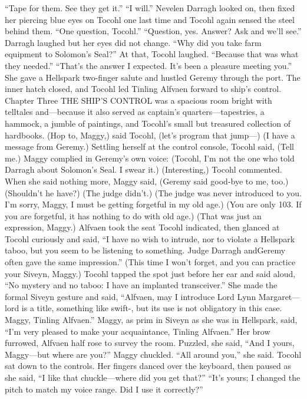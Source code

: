 \documentclass[9pt]{article}
\begin{document}
“Tape for them. See they get it.”
“I will.”
Nevelen Darragh looked on, then fixed her piercing blue eyes on Tocohl one last time and Tocohl
again sensed the steel behind them. “One question, Tocohl.”
“Question, yes. Answer? Ask and we’ll see.”
Darragh laughed but her eyes did not change. “Why did you take farm equipment to Solomon’s
Seal?”
At that, Tocohl laughed. “Because that was what they needed.”
“That’s the answer I expected. It’s been a pleasure meeting you.” She gave a Hellspark two-finger
salute and hustled Geremy through the port.
The inner hatch closed, and Tocohl led Tinling Alfvaen forward to ship’s control.
Chapter Three
THE SHIP’S CONTROL was a spacious room bright with telltales and—because it also served
as captain’s quarters—tapestries, a hammock, a jumble of paintings, and Tocohl’s small but treasured
collection of hardbooks.
(Hop to, Maggy,) said Tocohl, (let’s program that jump—)
(I have a message from Geremy.)
Settling herself at the control console, Tocohl said, (Tell me.)
Maggy complied in Geremy’s own voice: (Tocohl, I’m not the one who told Darragh about
Solomon’s Seal. I swear it.)
(Interesting,) Tocohl commented.
When she said nothing more, Maggy said, (Geremy said good-bye to me, too.)
(Shouldn’t he have?)
(The judge didn’t.)
(The judge was never introduced to you. I’m sorry, Maggy, I must be getting forgetful in my old age.)
(You are only 103. If you are forgetful, it has nothing to do with old age.)
(That was just an expression, Maggy.)
Alfvaen took the seat Tocohl indicated, then glanced at Tocohl curiously and said, “I have no wish to
intrude, nor to violate a Hellspark taboo, but you seem to be listening to something. Judge Darragh andGeremy often gave the same impression.”
(This time I won’t forget, and you can practice your Siveyn, Maggy.) Tocohl tapped the spot just
before her ear and said aloud, “No mystery and no taboo: I have an implanted transceiver.” She made
the formal Siveyn gesture and said, “Alfvaen, may I introduce Lord Lynn Margaret—lord is a title,
something like swift-, but its use is not obligatory in this case. Maggy, Tinling Alfvaen.”
Maggy, as prim in Siveyn as she was in Hellspark, said, “I’m very pleased to make your
acquaintance, Tinling Alfvaen.”
Her brow furrowed, Alfvaen half rose to survey the room. Puzzled, she said, “And I yours,
Maggy—but where are you?”
Maggy chuckled. “All around you,” she said.
Tocohl sat down to the controls. Her fingers danced over the keyboard, then paused as she said, “I
like that chuckle—where did you get that?”
“It’s yours; I changed the pitch to match my voice range. Did I use it correctly?”
\end{document}
